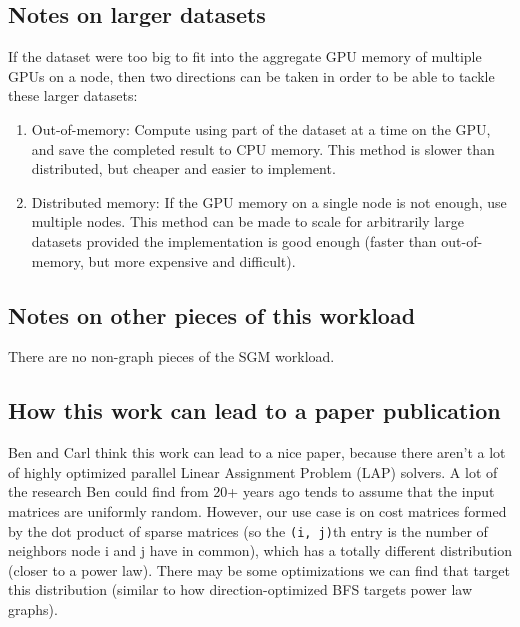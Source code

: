 \documentclass[10pt,oneside]{memoir}
\providecommand{\tightlist}{%
  \setlength{\itemsep}{0pt}\setlength{\parskip}{0pt}}
\begin{document}
\hypertarget{notes-on-larger-datasets-7}{%
\subsection{Notes on larger datasets}\label{notes-on-larger-datasets-7}}

If the dataset were too big to fit into the aggregate GPU memory of
multiple GPUs on a node, then two directions can be taken in order to be
able to tackle these larger datasets:

\begin{enumerate}
\def\labelenumi{\arabic{enumi}.}
\tightlist
\item
  Out-of-memory: Compute using part of the dataset at a time on the GPU,
  and save the completed result to CPU memory. This method is slower
  than distributed, but cheaper and easier to implement.
\item
  Distributed memory: If the GPU memory on a single node is not enough,
  use multiple nodes. This method can be made to scale for arbitrarily
  large datasets provided the implementation is good enough (faster than
  out-of-memory, but more expensive and difficult).
\end{enumerate}

\hypertarget{notes-on-other-pieces-of-this-workload-7}{%
\subsection{Notes on other pieces of this
workload}\label{notes-on-other-pieces-of-this-workload-7}}

There are no non-graph pieces of the SGM workload.

\hypertarget{how-this-work-can-lead-to-a-paper-publication}{%
\subsection{How this work can lead to a paper
publication}\label{how-this-work-can-lead-to-a-paper-publication}}

Ben and Carl think this work can lead to a nice paper, because there
aren't a lot of highly optimized parallel Linear Assignment Problem
(LAP) solvers. A lot of the research Ben could find from 20+ years ago
tends to assume that the input matrices are uniformly random. However,
our use case is on cost matrices formed by the dot product of sparse
matrices (so the \texttt{(i,\ j)}th entry is the number of neighbors
node i and j have in common), which has a totally different distribution
(closer to a power law). There may be some optimizations we can find
that target this distribution (similar to how direction-optimized BFS
targets power law graphs).
\end{document}
